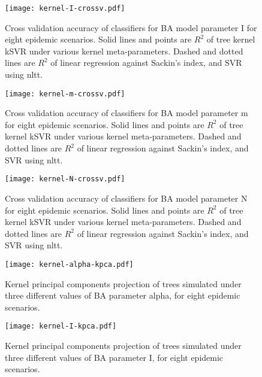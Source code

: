 \begin{figure}[ht]
  \centering
  \texttt{[image: kernel-I-crossv.pdf]}
  \caption[Cross validation accuracy of classifiers for \gls{BA} model parameter
    \gls{I} for eight epidemic scenarios.]
  {
    Cross validation accuracy of classifiers for \gls{BA} model parameter
    \gls{I} for eight epidemic scenarios. Solid lines and points are $R^2$ of
    tree kernel \gls{kSVR} under various kernel meta-parameters. Dashed and
    dotted lines are $R^2$ of linear regression against Sackin's index, and
    \gls{SVR} using \gls{nltt}.
  }
  \label{fig:Icrossv}
\end{figure}

\begin{figure}[ht]
  \centering
  \texttt{[image: kernel-m-crossv.pdf]}
  \caption[Cross validation accuracy of classifiers for \gls{BA} model parameter
    \gls{m} for eight epidemic scenarios.]
  {
    Cross validation accuracy of classifiers for \gls{BA} model parameter
    \gls{m} for eight epidemic scenarios. Solid lines and points are $R^2$ of
    tree kernel \gls{kSVR} under various kernel meta-parameters. Dashed and
    dotted lines are $R^2$ of linear regression against Sackin's index, and
    \gls{SVR} using \gls{nltt}.
  }
  \label{fig:mcrossv}
\end{figure}

\begin{figure}[ht]
  \centering
  \texttt{[image: kernel-N-crossv.pdf]}
  \caption[Cross validation accuracy of classifiers for \gls{BA} model parameter
    \gls{N} for eight epidemic scenarios.]
  {
    Cross validation accuracy of classifiers for \gls{BA} model parameter
    \gls{N} for eight epidemic scenarios. Solid lines and points are $R^2$ of
    tree kernel \gls{kSVR} under various kernel meta-parameters. Dashed and
    dotted lines are $R^2$ of linear regression against Sackin's index, and
    \gls{SVR} using \gls{nltt}.
  }
  \label{fig:Ncrossv}
\end{figure}

\clearpage

\begin{figure}[ht]
  \centering
  \texttt{[image: kernel-alpha-kpca.pdf]}
  \caption{
    Kernel principal components projection of trees simulated under three
    different values of \gls{BA} parameter \gls{alpha}, for eight epidemic
    scenarios.
  }
  \label{fig:alphakpca}
\end{figure}

\begin{figure}[ht]
  \centering
  \texttt{[image: kernel-I-kpca.pdf]}
  \caption{
    Kernel principal components projection of trees simulated under three
    different values of \gls{BA} parameter \gls{I}, for eight epidemic
    scenarios.
  }
  \label{fig:Ikpca}
\end{figure}

